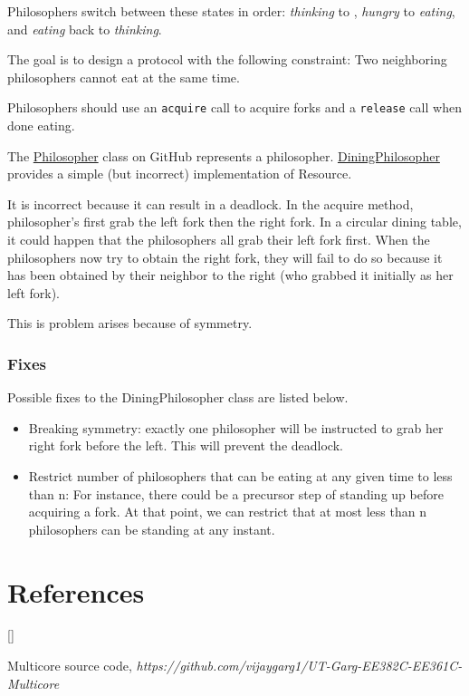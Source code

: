 \documentclass[twoside]{article}
\def\beginrefs{\begin{list}%
        {[\arabic{equation}]}{\usecounter{equation}
         \setlength{\leftmargin}{2.0truecm}\setlength{\labelsep}{0.4truecm}%
         \setlength{\labelwidth}{1.6truecm}}}
\def\endrefs{\end{list}}
\def\bibentry#1{\item[\hbox{[#1]}]}
\begin{document}
Philosophers switch between these states in order: {\it thinking} to {\hungry}, {\it hungry} to {\it eating}, and {\it eating} back to {\it thinking}.

The goal is to design a protocol with the following constraint: Two neighboring philosophers cannot eat at the same time.

Philosophers should use an {\tt acquire} call to acquire forks and a {\tt release} call when done eating.

The \href{https://github.com/vijaygarg1/UT-Garg-EE382C-EE361C-Multicore/blob/master/chapter3-synchronization_primitives/Philosopher.java}{Philosopher} class on GitHub represents a philosopher. \href{https://github.com/vijaygarg1/UT-Garg-EE382C-EE361C-Multicore/blob/master/chapter3-synchronization_primitives/DiningPhilosopher.java}{DiningPhilosopher} provides a simple (but incorrect) implementation of Resource.

It is incorrect because it can result in a deadlock. In the acquire method, philosopher's first grab the left fork then the right fork. In a circular dining table, it could happen that the philosophers all grab their left fork first. When the philosophers now try to obtain the right fork, they will fail to do so because it has been obtained by their neighbor to the right (who grabbed it initially as her left fork). 

This is problem arises because of symmetry.

\subsubsection{Fixes}

Possible fixes to the DiningPhilosopher class are listed below.

\begin{itemize}
    \item Breaking symmetry: exactly one philosopher will be instructed to grab her right fork before the left. This will prevent the deadlock.
    \item Restrict number of philosophers that can be eating at any given time to less than n: For instance, there could be a precursor step of standing up before acquiring a fork. At that point, we can restrict that at most less than n philosophers can be standing at any instant.
\end{itemize}

\section*{References}
\beginrefs
\bibentry{GitHub}{} Multicore source code, {\it https://github.com/vijaygarg1/UT-Garg-EE382C-EE361C-Multicore}
\endrefs
\end{document}
